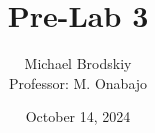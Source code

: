 


\title{Pre-Lab 3}
\date{October 14, 2024}
\author{Michael Brodskiy\\ \small Professor: M. Onabajo}



\maketitle


